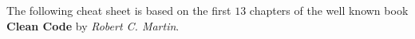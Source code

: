 The following cheat sheet is based on the first $13$ chapters of the well known book \textbf{Clean Code}
by \textit{Robert C. Martin}.
